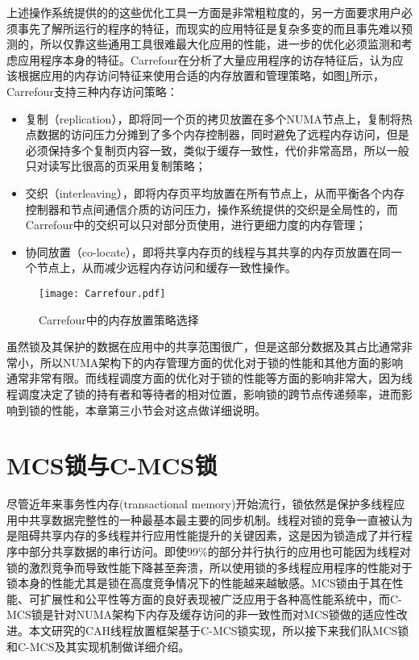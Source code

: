 上述操作系统提供的的这些优化工具一方面是非常粗粒度的，另一方面要求用户必须事先了解所运行的程序的特征，而现实的应用特征是复杂多变的而且事先难以预测的，所以仅靠这些通用工具很难最大化应用的性能，进一步的优化必须监测和考虑应用程序本身的特征。Carrefour\cite{dashti2013traffic}在分析了大量应用程序的访存特征后，认为应该根据应用的内存访问特征来使用合适的内存放置和管理策略，如图\ref{Fig:carrefour}所示，Carrefour支持三种内存访问策略：
\begin{itemize}
\item  复制（replication），即将同一个页的拷贝放置在多个NUMA节点上，复制将热点数据的访问压力分摊到了多个内存控制器，同时避免了远程内存访问，但是必须保持多个复制页内容一致，类似于缓存一致性，代价非常高昂，所以一般只对读写比很高的页采用复制策略；
\item  交织（interleaving），即将内存页平均放置在所有节点上，从而平衡各个内存控制器和节点间通信介质的访问压力，操作系统提供的交织是全局性的，而Carrefour中的交织可以只对部分页使用，进行更细力度的内存管理；
\item 协同放置（co-locate），即将共享内存页的线程与其共享的内存页放置在同一个节点上，从而减少远程内存访问和缓存一致性操作。
\end{itemize}

\begin{figure}[t]
	\centering
	\texttt{[image: Carrefour.pdf]}
	\caption{Carrefour中的内存放置策略选择}
	\label{Fig:carrefour}
\end{figure}

虽然锁及其保护的数据在应用中的共享范围很广，但是这部分数据及其占比通常非常小，所以NUMA架构下的内存管理方面的优化对于锁的性能和其他方面的影响通常非常有限。而线程调度方面的优化对于锁的性能等方面的影响非常大，因为线程调度决定了锁的持有者和等待者的相对位置，影响锁的跨节点传递频率，进而影响到锁的性能，本章第三小节会对这点做详细说明。

\section{MCS锁与C-MCS锁}
尽管近年来事务性内存(transactional memory)\cite{larus2008transactional}开始流行，锁依然是保护多线程应用中共享数据完整性的一种最基本最主要的同步机制\cite{tallent2010analyzing}。线程对锁的竞争一直被认为是阻碍共享内存的多线程并行应用性能提升的关键因素，这是因为锁造成了并行程序中部分共享数据的串行访问\cite{tallent2010analyzing}。即使99\%的部分并行执行的应用也可能因为线程对锁的激烈竞争而导致性能下降甚至奔溃，所以使用锁的多线程应用程序的性能对于锁本身的性能尤其是锁在高度竞争情况下的性能越来越敏感\cite{johnson2010decoupling}。MCS锁由于其在性能、可扩展性和公平性等方面的良好表现被广泛应用于各种高性能系统中，而C-MCS锁是针对NUMA架构下内存及缓存访问的非一致性而对MCS锁做的适应性改进。本文研究的CAH线程放置框架基于C-MCS锁实现，所以接下来我们队MCS锁和C-MCS及其实现机制做详细介绍。
